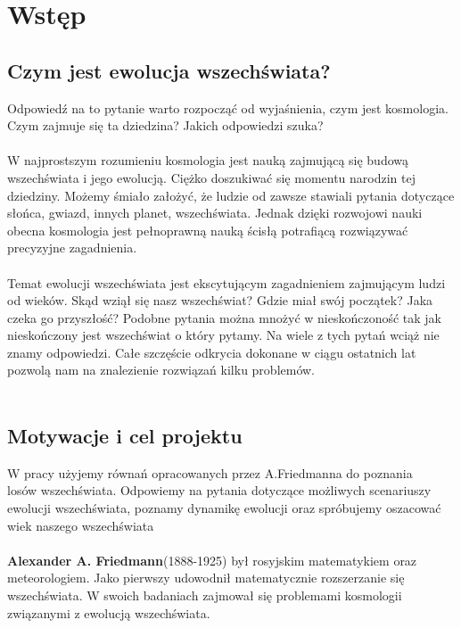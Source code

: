\documentclass[12pt]{article}
\author{Paweł Budzyński}
\title{}
\date{07.01.2017r.}
\begin{document}
	\maketitle

		
	\section{Wstęp}
	
	\subsection{Czym jest ewolucja wszechświata?}
	Odpowiedź na to pytanie warto rozpocząć od wyjaśnienia, czym jest kosmologia. Czym zajmuje się ta dziedzina? Jakich odpowiedzi szuka?\\\\
	W najprostszym rozumieniu kosmologia jest nauką zajmującą się budową wszechświata i jego ewolucją. Ciężko doszukiwać się momentu narodzin tej dziedziny. Możemy śmiało założyć, że ludzie od zawsze stawiali pytania dotyczące słońca, gwiazd, innych planet, wszechświata. Jednak dzięki rozwojowi nauki obecna kosmologia jest pełnoprawną nauką ścisłą potrafiącą rozwiązywać precyzyjne zagadnienia.  \\\\
	Temat ewolucji wszechświata jest ekscytującym zagadnieniem zajmującym ludzi od wieków. Skąd wziął się nasz wszechświat? Gdzie miał swój początek? Jaka czeka go przyszłość? Podobne pytania można mnożyć w nieskończoność tak jak nieskończony jest wszechświat o który pytamy. Na wiele z tych pytań wciąż nie znamy odpowiedzi.
	Całe szczęście odkrycia dokonane w ciągu ostatnich lat pozwolą nam na znalezienie rozwiązań kilku problemów. \\\\
	\subsection{Motywacje i cel projektu}
	W pracy użyjemy równań opracowanych przez A.Friedmanna do poznania\\ losów wszechświata. Odpowiemy na pytania dotyczące możliwych scenariuszy ewolucji wszechświata, poznamy dynamikę ewolucji oraz spróbujemy oszacować wiek naszego wszechświata\\\\
	\textbf{Alexander A. Friedmann}(1888-1925) był rosyjskim matematykiem oraz meteorologiem. Jako pierwszy udowodnił matematycznie rozszerzanie się wszechświata. W swoich badaniach zajmował się problemami kosmologii związanymi z ewolucją wszechświata.\cite{Biog01}\\\\
	
\end{document}
